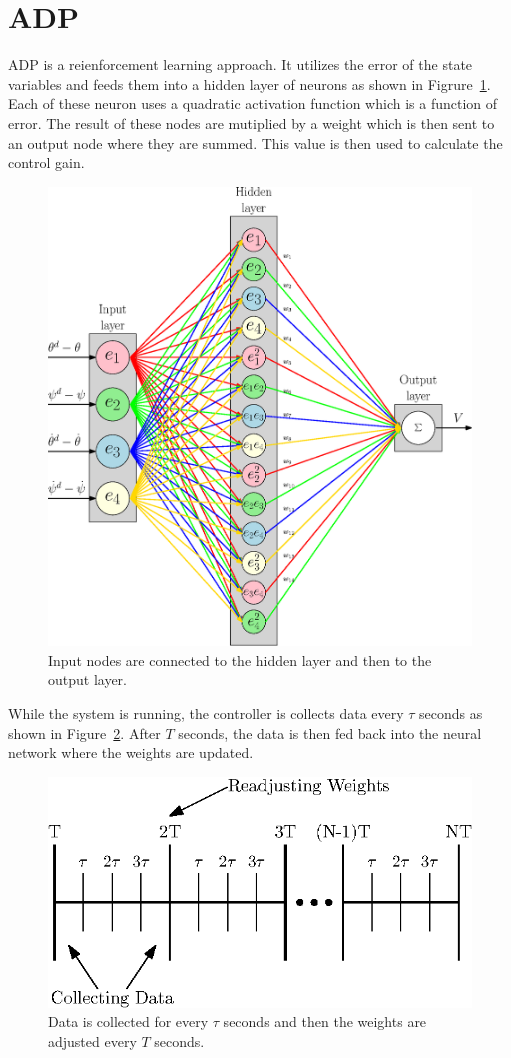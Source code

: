 \section{ADP}
ADP is a reienforcement learning approach.  It utilizes the error of the state variables and feeds them into a hidden layer of neurons as shown in Figrure~\ref{fig:ADP_Neural_Network}.  Each of these neuron uses a quadratic activation function which is a function of error.  The result of these nodes are mutiplied by a weight which is then sent to an output node where they are summed.  This value is then used to calculate the control gain. 
\begin{figure}[!htbp]
    \centering
    \includegraphics[width=.46\textwidth,keepaspectratio=true]{figs/ipe/ADP_Neural_Network.eps}
    \caption{Input nodes are connected to the hidden layer and then to the output layer.}
    \label{fig:ADP_Neural_Network}
\end{figure}
While the system is running, the controller is collects data every $\tau$ seconds as shown in Figure~\ref{fig:ADP_Samples}.  After $T$ seconds, the data is then fed back into the neural network where the weights are updated.
\begin{figure}[!htbp]
    \centering
    \includegraphics[width=.46\textwidth,keepaspectratio=true]{figs/ipe/ADP_Samples.eps}
    \caption{Data is collected for every $\tau$ seconds and then the weights are adjusted every $T$ seconds.}
    \label{fig:ADP_Samples}
\end{figure}

